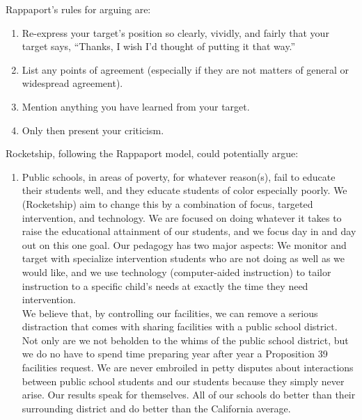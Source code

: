 Rappaport's rules for arguing are:
\begin{enumerate}[topsep=0.3\baselineskip,itemsep=0.25\baselineskip]
  \item Re-express your target’s position so clearly, vividly, and fairly that your target says, “Thanks, I wish I’d thought of putting it that way.”
  \item List any points of agreement (especially if they are not matters of general or widespread agreement).
  \item Mention anything you have learned from your target.
  \item Only then present your criticism.
\end{enumerate}
\medskip

Rocketship, following the Rappaport model, could potentially argue:
\begin{enumerate}[topsep=0.3\baselineskip,itemsep=0.25\baselineskip]
  \item Public schools, in areas of poverty, for whatever reason(s), fail to educate their students well, and they educate students of color especially poorly. We (Rocketship) aim to change this by a combination of focus, targeted intervention, and technology. We are focused on doing whatever it takes to raise the educational attainment of our students, and we focus day in and day out on this one goal. Our pedagogy has two major aspects: We monitor and target with specialize intervention students who are not doing as well as we would like, and we use technology (computer-aided instruction) to tailor instruction to a specific child's needs at exactly the time they need intervention.\\
  We believe that, by controlling our facilities, we can remove a serious distraction that comes with sharing facilities with a public school district. Not only are we not beholden to the whims of the public school district, but we do no have to spend time preparing year after year a Proposition 39 facilities request. We are never embroiled in petty disputes about interactions between public school students and our students because they simply never arise. Our results speak for themselves. All of our schools do better than their surrounding district and do better than the California average.
\end{enumerate}


